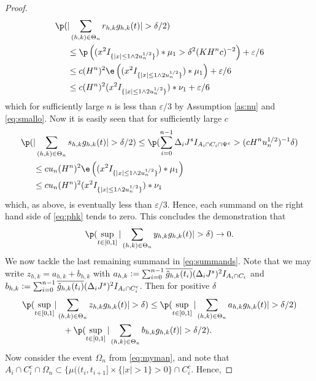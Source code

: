 \begin{proof}
\begin{align}
\p(&\vert\sumt r_{h,k} \ghk(t) \vert > \delta/2) \notag \\%
&\le  \p\left( (x^2I_{\{\vert x\vert \le 1 \wedge 2 u_n^{1/2}\}})\ast\mu_1 > \delta^2 (K H^nc)^{-2}\right) + \varepsilon/6\notag\\
&\le  c (H^n)^{2}\e\left( (x^2I_{\{\vert x\vert \le 1 \wedge 2 u_n^{1/2}\}})\ast\mu_1  \right) + \varepsilon/6\notag\\
&\le c(H^n)^{2} (x^2I_{\{\vert x\vert \le 1 \wedge 2 u_n^{1/2}\}})\ast\nu_1   + \varepsilon/6\notag 
  \label{}
\end{align}
which for sufficiently large $n$ is  less than $\varepsilon/3$ by Assumption \ref{as:nu} and \eqref{eq:smallo}.
Now it is easily seen that for sufficiently large $c$
\begin{align}
  \p(&\vert \sumt s_{h,k} \ghk(t) \vert > \delta/2) \le \p( \sumin  \djt I_{A_i \cap C_i \cap \Psi^c} > ( c H^nu_n^{1/2})^{-1}\delta) \notag\\
  &\le  c u_n (H^n)^2 \e\left( (x^2I_{\{\vert x\vert \le 1 \wedge 2 u_n^{1/2}\}})\ast\mu_1  \right)\notag \\
  & \le   c u_n (H^n)^2  (x^2I_{\{\vert x\vert \le 1 \wedge 2 u_n^{1/2}\}})\ast\nu_1
  \label{}
\end{align}
which, as above, is  eventually less than $\varepsilon/3$. Hence, each summand on the right hand side of \eqref{eq:phk} tends to zero. This concludes the demonstration that
\begin{align}
  \notag
  \p(\sup_{t \in [0,1]}\vert \sumt y_{h,k} \ghk(t) \vert > \delta) \to 0.\label{eq:y}
\end{align}
We  now tackle the last remaining summand in \eqref{eq:summands}.  Note that we may write   $z_{h,k} = a_{h,k} + b_{h,k}$ with $a_{h,k} :=  \sum_{i = 0}^{n-1} \overline{\tilde{g}_{h,k}(t_i)}(\Delta_i J^s)^2I_{A_i \cap C_i}$ and  $b_{h,k} := \sum_{i = 0}^{n-1} \overline{\tilde{g}_{h,k}(t_i)}(\Delta_i J^s)^2I_{A_i \cap C_i^c}$. Then for positive $\delta$ 
\begin{align}
  \p(\sup_{t \in \domain}&\vert \sumt z_{h,k} \ghk(t) \vert   > \delta)  \le \p(\sup_{t \in \domain}\vert \sumt a_{h,k} \ghk(t) \vert > \delta/2)\notag \\ 
  & \quad + \p(\sup_{t \in \domain}\vert \sumt b_{h,k} \ghk(t) \vert > \delta/2)\notag.
\end{align}
Now consider the event $\Omega_n$ from \eqref{eq:myman}, and note that  $A_i \cap C_i^c \cap \Omega_n \subset  \{\mu ( (t_i, t_{i + 1}] \times \{\vert x \vert > 1\} > 0\} \cap C_i^c$. Hence,   

\end{proof}
